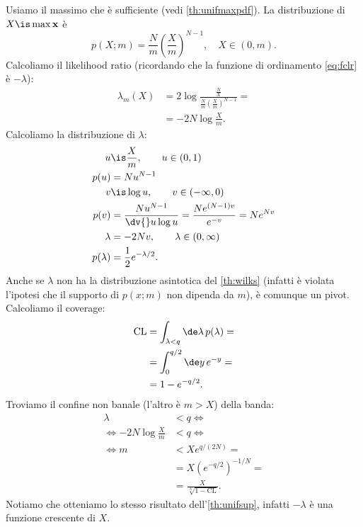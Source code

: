 \begin{solution}
	Usiamo il massimo che è sufficiente (vedi \autoref{th:unifmaxpdf}).
	La distribuzione di $X\is\max\mathbf x$ è
	\begin{equation*}
		p(X;m)
		= \frac Nm \left(\frac Xm\right)^{N-1},
		\quad X \in (0,m).
	\end{equation*}
	Calcoliamo il likelihood ratio (ricordando che la funzione di
    ordinamento \eqref{eq:fclr} è $-\lambda$):
	\begin{align*}
		\lambda_m(X)
		&= 2\log\frac {\frac NX} {\frac Nm \left(\frac Xm\right)^{N-1}} = \\
		&= -2N\log\frac Xm.
	\end{align*}
	Calcoliamo la distribuzione di $\lambda$:
	\begin{align*}
		u
		&\is \frac Xm, \qquad u \in (0, 1) \\
		p(u)
		&= N u^{N-1} \\
		v
		&\is \log u, \qquad v \in (-\infty, 0) \\
		p(v)
		&= \frac{Nu^{N-1}}{\dv{}u\log u}
		= \frac{Ne^{(N-1)v}}{e^{-v}}
		= N e^{Nv} \\
		\lambda
		&= -2Nv, \qquad \lambda \in (0, \infty) \\
		p(\lambda)
		&= \frac 12 e^{-\lambda/2}.
	\end{align*}
	Anche se $\lambda$ non ha la distribuzione asintotica del \autoref{th:wilks}
	(infatti è violata l'ipotesi che il supporto di $p(x;m)$ non dipenda da $m$),
	è comunque un pivot.
	Calcoliamo il coverage:
	\begin{align*}
		\mathrm{CL}
		&= \int_{\lambda<q} \de\lambda\, p(\lambda) = \\
		&= \int_0^{q/2} \de y\, e^{-y} = \\
		&= 1 - e^{-q/2}.
	\end{align*}
	Troviamo il confine non banale (l'altro è $m>X$) della banda:
	\begin{align*}
		\lambda
		&< q \iff \\
		\iff -2N\log\frac Xm
		&< q \iff \\
		\iff m
		&< Xe^{q/(2N)} = \\
		&= X\left(e^{-q/2}\right)^{-1/N} = \\
		&= \frac X {\sqrt[N]{1-\mathrm{CL}}}.
	\end{align*}
	Notiamo che otteniamo lo stesso risultato dell'\autoref{th:unifsup},
    infatti $-\lambda$ è una funzione crescente di $X$.
\end{solution}

